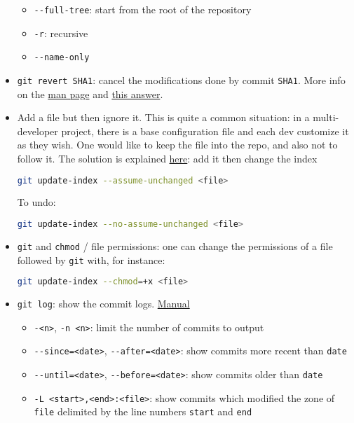 \documentclass[a4paper,12pt,%
              final%
              ]{article}
\begin{document}
\begin{itemize}
    \begin{itemize}
      \item \verb|--full-tree|: start from the root of the repository
      \item \verb|-r|: recursive
      \item \verb|--name-only|
    \end{itemize}
  \item \texttt{git revert SHA1}: cancel the modifications done by commit \texttt{SHA1}. More info on the \href{https://git-scm.com/docs/git-revert}{man page} and \href{https://stackoverflow.com/a/4114122}{this answer}.
  \item Add a file but then ignore it. This is quite a common situation: in a multi-developer project, there is a base configuration file and each dev customize it as they wish. One would like to keep the file into the repo, and also not to follow it. The solution is explained \href{https://stackoverflow.com/questions/3319479/can-i-git-commit-a-file-and-ignore-its-content-changes}{here}: add it then change the index
\begin{lstlisting}[language=bash]
git update-index --assume-unchanged <file>
\end{lstlisting}
    To undo:
\begin{lstlisting}[language=bash]
git update-index --no-assume-unchanged <file>
\end{lstlisting}
  \item \texttt{git} and \texttt{chmod} / file permissions: one can change the permissions of a file followed by \texttt{git} with, for instance:
\begin{lstlisting}[language=bash]
git update-index --chmod=+x <file>
\end{lstlisting}
  \item \texttt{git log}: show the commit logs. \href{https://git-scm.com/docs/git-log}{Manual}
    \begin{itemize}
      \item \texttt{-<n>}, \texttt{-n <n>}: limit the number of commits to output
      \item \verb|--since=<date>|, \verb|--after=<date>|: show commits more recent than \texttt{date}
      \item \verb|--until=<date>|, \verb|--before=<date>|: show commits older than \texttt{date}
      \item \verb|-L <start>,<end>:<file>|: show commits which modified the zone of \texttt{file} delimited by the line numbers \texttt{start} and \texttt{end}

\end{itemize}
\end{itemize}
\end{document}
